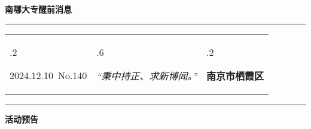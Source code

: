 \documentclass[letterpaper, 12pt]{article}
\begin{document}
\begin{center}
    \Huge\textbf{南哪大专醒前消息}
\end{center}
\vspace{4mm}
\hrule
\renewcommand\tabularxcolumn[1]{m{#1}}
\begin{tabularx}{\textwidth}{>{\hsize.2\hsize}X>{\hsize.6\hsize}X>{\hsize.2\hsize}X}
    \begin{flushleft}
        2024.12.10\, No.140
    \end{flushleft}
    &
    \begin{center}
        \textit{“秉中持正、求新博闻。”}
    \end{center}
    &
    \begin{flushright}
        \textbf{南京市栖霞区}
    \end{flushright}
\end{tabularx}
\vspace{-3.5mm}
\hrule
\vspace{4mm}
\centerline{\huge\textbf{活动预告}}
\end{document}
